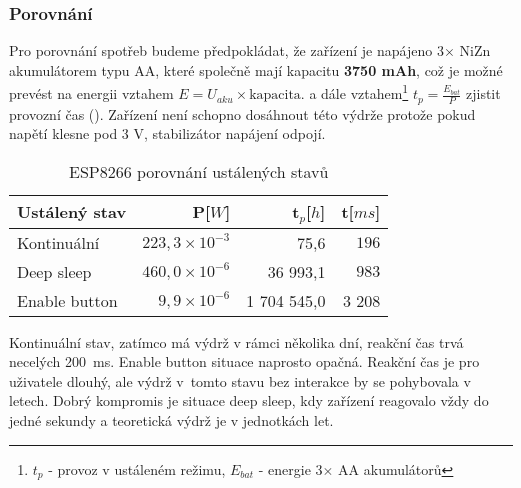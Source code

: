 \documentclass[a4paper, 12pt]{report}
\begin{document}
				\subsubsection{Porovnání}
					Pro porovnání spotřeb budeme předpokládat, že zařízení je napájeno 3$\times$ NiZn akumulátorem typu AA, které společně mají kapacitu {\bf 3750 mAh}, což je možné prevést na energii vztahem $E = U_{aku}\times \textrm{kapacita}$.
					a dále vztahem\footnote{$ t_{p}$ - provoz v ustáleném režimu, $ E_{bat}$ - energie 3$\times$ AA akumulátorů} $ t_{p} = \frac{E_{bat}}{P}$ zjistit provozní čas (). Zařízení není schopno dosáhnout této výdrže protože pokud napětí klesne pod 3 V, stabilizátor napájení odpojí.\\
					\begin{table}[]
						\centering
						\caption{ESP8266 porovnání ustálených stavů}
						\begin{tabular}{||l|r r r||}
							\hline
							Ustálený stav & P[$W$]& t$_{p}$[$h$] & t[$ms$]\\
							\hline
							Kontinuální & $223,3 \times 10^{-3}$& 75,6 & $196$\\
							Deep sleep & $460,0 \times 10^{-6}$& 36 993,1 & $983$\\
							Enable button & $9,9\times 10^{-6}$& 1 704 545,0 &  3 208\\
							\hline
						\end{tabular}
						\label{ESP8266 klidové režimy porovnani}
					\end{table}
					Kontinuální stav, zatímco má výdrž v rámci několika dní, reakční čas trvá necelých 200~ms. Enable button situace naprosto opačná. Reakční čas je pro uživatele dlouhý, ale výdrž v~tomto stavu bez interakce by se pohybovala v letech. Dobrý kompromis je situace deep sleep, kdy zařízení reagovalo vždy do jedné sekundy a teoretická výdrž je v jednotkách let.\\
\end{document}
